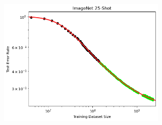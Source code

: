 \documentclass{article} %
\begin{document}

\clearpage

\vspace*{-15.325mm}

\begin{figure}[h]
    \centering


\includegraphics[width=0.72\textwidth]{figures/order_of_magnitude__data_x-axis/imagenet_25___MiX_L_16.png}



\end{figure}
\end{document}
